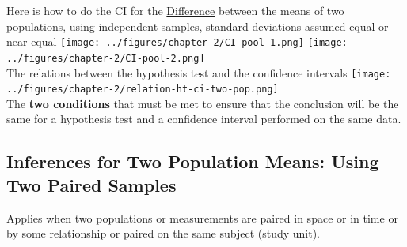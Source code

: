 \documentclass[../STAT-252-Notes.tex]{subfiles}
\begin{document}
Here is how to do the CI for the \underline{Difference} between the means of two populations, using independent samples, standard deviations assumed equal or near equal
{\centering\texttt{[image: ../figures/chapter-2/CI-pool-1.png]}
\texttt{[image: ../figures/chapter-2/CI-pool-2.png]}~\\
The relations between the hypothesis test and the confidence intervals
\texttt{[image: ../figures/chapter-2/relation-ht-ci-two-pop.png]}
~\\}
The \textbf{two conditions} that must be met to ensure that the conclusion will be the same for a hypothesis test and a confidence interval performed on the same data.


\subsection{Inferences for Two Population Means: Using Two Paired Samples}
Applies when two populations or measurements are paired in space or in time or by some relationship or paired on the same subject (study unit).
\end{document}
